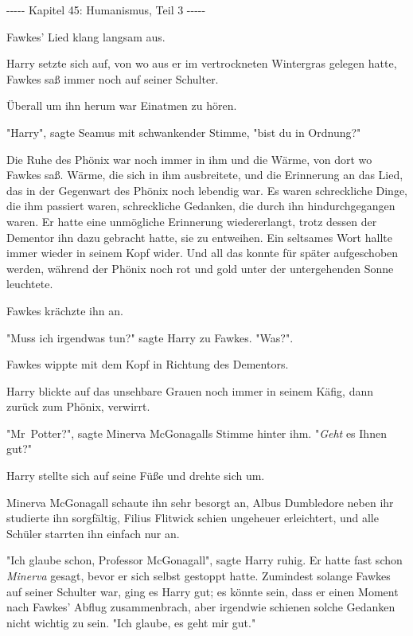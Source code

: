 

\hypertarget{humanismus-teil-3}{%

-\/-\/-\/-\/- Kapitel 45: Humanismus, Teil 3 -\/-\/-\/-\/-

Fawkes' Lied klang langsam aus.

Harry setzte sich auf, von wo aus er im vertrockneten Wintergras gelegen hatte, Fawkes saß immer noch auf seiner Schulter.

Überall um ihn herum war Einatmen zu hören.

"Harry", sagte Seamus mit schwankender Stimme, "bist du in Ordnung?"

Die Ruhe des Phönix war noch immer in ihm und die Wärme, von dort wo Fawkes saß. Wärme, die sich in ihm ausbreitete, und die Erinnerung an das Lied, das in der Gegenwart des Phönix noch lebendig war. Es waren schreckliche Dinge, die ihm passiert waren, schreckliche Gedanken, die durch ihn hindurchgegangen waren. Er hatte eine unmögliche Erinnerung wiedererlangt, trotz dessen der Dementor ihn dazu gebracht hatte, sie zu entweihen. Ein seltsames Wort hallte immer wieder in seinem Kopf wider. Und all das konnte für später aufgeschoben werden, während der Phönix noch rot und gold unter der untergehenden Sonne leuchtete.

Fawkes krächzte ihn an.

"Muss ich irgendwas tun?" sagte Harry zu Fawkes. "Was?".

Fawkes wippte mit dem Kopf in Richtung des Dementors.

Harry blickte auf das unsehbare Grauen noch immer in seinem Käfig, dann zurück zum Phönix, verwirrt.

"Mr~Potter?", sagte Minerva McGonagalls Stimme hinter ihm. "\emph{Geht} es Ihnen gut?"

Harry stellte sich auf seine Füße und drehte sich um.

Minerva McGonagall schaute ihn sehr besorgt an, Albus Dumbledore neben ihr studierte ihn sorgfältig, Filius Flitwick schien ungeheuer erleichtert, und alle Schüler starrten ihn einfach nur an.

"Ich glaube schon, Professor McGonagall", sagte Harry ruhig. Er hatte fast schon \emph{Minerva} gesagt, bevor er sich selbst gestoppt hatte. Zumindest solange Fawkes auf seiner Schulter war, ging es Harry gut; es könnte sein, dass er einen Moment nach Fawkes' Abflug zusammenbrach, aber irgendwie schienen solche Gedanken nicht wichtig zu sein. "Ich glaube, es geht mir gut."

}

